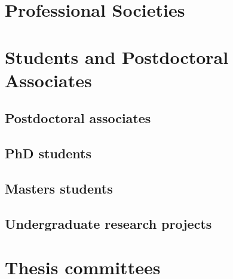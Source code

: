 \documentclass{article}
\begin{document}

\section*{Professional Societies}




\section*{Students and Postdoctoral Associates}

\subsection*{Postdoctoral associates}



\subsection*{PhD students}



\subsection*{Masters students}



\subsection*{Undergraduate research projects}




\section*{Thesis committees}




\end{document}

